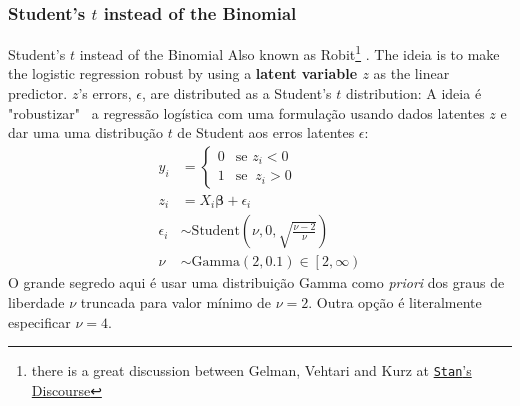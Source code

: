 \subsubsection{Student's $t$ instead of the Binomial}
\begin{frame}{Student's $t$ instead of the Binomial}
	\small
	Also known as Robit\footnote{there is a great discussion between
		Gelman, Vehtari and Kurz at
		\href{https://discourse.mc-stan.org/t/robit-regression-not-robust/21245/}{
			\texttt{Stan}'s Discourse}} \parencite{gelman2013bayesian, gelman2020regression}.
	The ideia is to make the logistic regression robust by using a
	\textbf{latent variable $z$} as the linear predictor.
	$z$'s errors, $\epsilon$, are distributed as a Student's $t$ distribution:
	A ideia é "robustizar"~ a regressão logística com uma formulação usando dados
	latentes $z$ e dar uma uma distribução $t$ de Student aos erros latentes $\epsilon$:
	$$
		\begin{aligned}
			y_i        & = \begin{cases} 0 & \text{se } z_i < 0 \\ 1 & \text{se }\ z_i > 0 \end{cases} \\
			z_i        & = X_i \boldsymbol{\beta} + \epsilon_i                                         \\
			\epsilon_i & \sim \text{Student} \left (\nu, 0, \sqrt{\frac{\nu - 2}{\nu}} \right)         \\
			\nu        & \sim \text{Gamma}(2, 0.1) \in \left[2, \infty \right)
		\end{aligned}
	$$
	\footnotesize
	O grande segredo aqui é usar uma distribuição Gamma como \textit{priori}
	dos graus de liberdade $\nu$ truncada para valor mínimo de $\nu = 2$. Outra opção
	é literalmente especificar $\nu=4$.
\end{frame}


